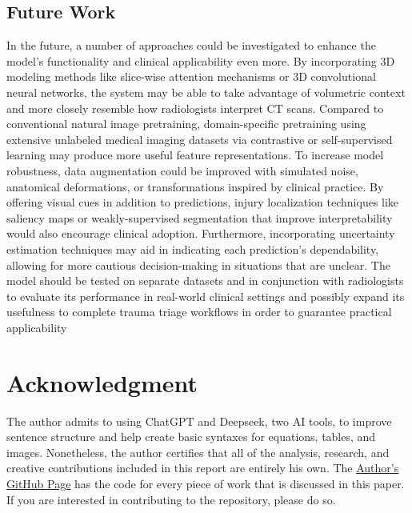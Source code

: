 \documentclass[a4paper,12pt]{article}
\begin{document}
\subsection{Future Work}

In the future, a number of approaches could be investigated to enhance the model's functionality and clinical applicability even more. By incorporating 3D modeling methods like slice-wise attention mechanisms or 3D convolutional neural networks, the system may be able to take advantage of volumetric context and more closely resemble how radiologists interpret CT scans. Compared to conventional natural image pretraining, domain-specific pretraining using extensive unlabeled medical imaging datasets via contrastive or self-supervised learning may produce more useful feature representations. To increase model robustness, data augmentation could be improved with simulated noise, anatomical deformations, or transformations inspired by clinical practice. By offering visual cues in addition to predictions, injury localization techniques like saliency maps or weakly-supervised segmentation that improve interpretability would also encourage clinical adoption. Furthermore, incorporating uncertainty estimation techniques may aid in indicating each prediction's dependability, allowing for more cautious decision-making in situations that are unclear. The model should be tested on separate datasets and in conjunction with radiologists to evaluate its performance in real-world clinical settings and possibly expand its usefulness to complete trauma triage workflows in order to guarantee practical applicability
\clearpage

\section{Acknowledgment}
The author admits to using ChatGPT and Deepseek, two AI tools, to improve sentence structure and help create basic syntaxes for equations, tables, and images. Nonetheless, the author certifies that all of the analysis, research, and creative contributions included in this report are entirely his own. The  \href{https://github.com/aafiakhalid5/Abdominal-Trauma-Detection}{ Author's GitHub Page} has the code for every piece of work that is discussed in this paper. If you are interested in contributing to the repository, please do so.

\clearpage


\end{document}
